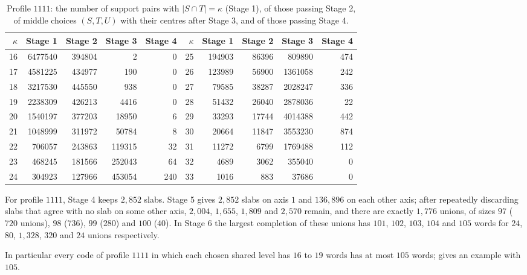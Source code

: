 \documentclass[11pt,colorlinks]{charlie}
\begin{document}
\begin{table}[ht]\centering\small
\caption{Profile $1111$: the number of support pairs with $|S\cap T|=\kappa$ (Stage 1), of those passing Stage 2, of middle choices $(S,T,U)$ with their centres after Stage 3, and of those passing Stage 4.}\label{tab:census}
\setlength{\tabcolsep}{4pt}
\begin{tabular}{@{}rrrrr@{\quad}rrrrr@{}}
\toprule
$\kappa$&Stage 1&Stage 2&Stage 3&Stage 4&$\kappa$&Stage 1&Stage 2&Stage 3&Stage 4\\\midrule
16&6477540&394804&2&0&25&194903&86396&809890&474\\
17&4581225&434977&190&0&26&123989&56900&1361058&242\\
18&3217530&445550&938&0&27&79585&38287&2028247&336\\
19&2238309&426213&4416&0&28&51432&26040&2878036&22\\
20&1540197&377203&18950&6&29&33293&17744&4014388&442\\
21&1048999&311972&50784&8&30&20664&11847&3553230&874\\
22&706057&243863&119315&32&31&11272&6799&1769488&112\\
23&468245&181566&252043&64&32&4689&3062&355040&0\\
24&304923&127966&453054&240&33&1016&883&37686&0\\
\bottomrule
\end{tabular}
\end{table}

\begin{lemma}\label{lem:1111}
For profile $1111$, Stage 4 keeps $2{,}852$ slabs. Stage 5 gives $2{,}852$ slabs on axis $1$ and $136{,}896$ on each other axis; after repeatedly discarding slabs that agree with no slab on some other axis, $2{,}004$, $1{,}655$, $1{,}809$ and $2{,}570$ remain, and there are exactly $1{,}776$ unions, of sizes $97$ ($720$ unions), $98$ ($736$), $99$ ($280$) and $100$ ($40$). In Stage 6 the largest completion of these unions has $101$, $102$, $103$, $104$ and $105$ words for $24$, $80$, $1{,}328$, $320$ and $24$ unions respectively.
\end{lemma}

In particular every code of profile $1111$ in which each chosen shared level has $16$ to $19$ words has at most $105$ words;  gives an example with $105$.
\end{document}
